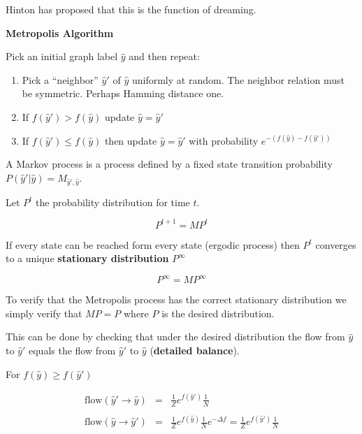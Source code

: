 {\vfill
Hinton has proposed that this is the function of dreaming.


\centerline{\bf Metropolis Algorithm}


\vfill
Pick an initial graph label $\hat{y}$ and then repeat:

\begin{enumerate}
\item Pick a ``neighbor'' $\hat{y}'$ of $\hat{y}$ uniformly at random.  The neighbor relation must be symmetric.  Perhaps Hamming distance one.

  \vfill
\item If $f(\hat{y}') > f(\hat{y})$ update $\hat{y} = \hat{y}'$

  \vfill
\item If $f(\hat{y}') \leq f(\hat{y})$ then update $\hat{y} = \hat{y}'$ with probability $e^{-(f(\hat{y}) - f(\hat{y}'))}$
  \end{enumerate}  


A Markov process is a process defined by a fixed state transition probability $P(\hat{y}'|\hat{y}) = M_{\hat{y}',\hat{y}}$.

\vfill
Let $P^t$ the probability distribution for time $t$.

\vfill
$$P^{t+1} = MP^t$$

\vfill
If every state can be reached form every state (ergodic process) then $P^t$ converges to a unique {\bf stationary distribution} $P^\infty$

\vfill
$$P^\infty = MP^\infty$$


To verify that the Metropolis process has the correct stationary distribution we simply verify that $MP = P$ where $P$
is the desired distribution.

\vfill
This can be done by checking that under the desired distribution the flow from $\hat{y}$ to $\hat{y}'$
equals the flow from $\hat{y}'$ to $\hat{y}$ ({\bf detailed balance}).


For $f(\hat{y}) \geq f(\hat{y}')$

\vfill
\begin{eqnarray*}
  \mathrm{flow}(\hat{y}' \rightarrow \hat{y}) &  = & \frac{1}{Z}e^{f(\hat{y}')} \frac{1}{N} \\
  \\
\mathrm{flow}(\hat{y} \rightarrow \hat{y}') & = & \frac{1}{Z}e^{f(\hat{y})} \frac{1}{N} e^{-\Delta f} = \frac{1}{Z} e^{f(\hat{y}')} \frac{1}{N}
\end{eqnarray*}

}
